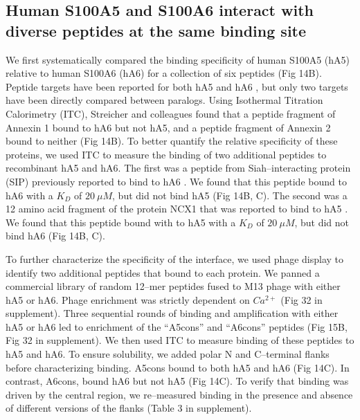 \subsection{Human S100A5 and S100A6 interact with diverse peptides at the same
binding site}

We first systematically compared the binding specificity of human
S100A5 (hA5) relative to human S100A6 (hA6) for a collection of six
peptides (Fig 14B). Peptide targets have been reported for both hA5
and hA6 \citep{lee_structure_2008,leclerc_binding_2009,slomnicki_s100a6_2009,streicher_annexin_2009,van_dieck_modulation_2009,liriano_structure_2012,cho_pentamidine_2016},
but only two targets have been directly compared between paralogs.
Using Isothermal Titration Calorimetry (ITC), Streicher and colleagues
found that a peptide fragment of Annexin 1 bound to hA6 but not hA5,
and a peptide fragment of Annexin 2 bound to neither \citep{streicher_annexin_2009}
(Fig 14B). To better quantify the relative specificity of these proteins,
we used ITC to measure the binding of two additional peptides to recombinant
hA5 and hA6. The first was a peptide from Siah--interacting protein
(SIP) previously reported to bind to hA6 \citep{lee_structure_2008}.
We found that this peptide bound to hA6 with a $K_{D}$ of $20\ \mu M$,
but did not bind hA5 (Fig 14B, C). The second was a 12 amino acid fragment
of the protein NCX1 that was reported to bind to hA5 \citep{liriano_structure_2012}.
We found that this peptide bound with to hA5 with a $K_{D}$ of $20\ \mu M$,
but did not bind hA6 (Fig 14B, C). 

To further characterize the specificity of the interface, we used
phage display to identify two additional peptides that bound to each
protein. We panned a commercial library of random 12--mer peptides
fused to M13 phage with either hA5 or hA6. Phage enrichment was strictly
dependent on $Ca^{2+}$ (Fig 32 in supplement). Three sequential rounds of binding
and amplification with either hA5 or hA6 led to enrichment of the
``A5cons'' and ``A6cons'' peptides (Fig 15B, Fig 32 in supplement). We then used
ITC to measure binding of these peptides to hA5 and hA6. To ensure
solubility, we added polar N and C--terminal flanks before characterizing
binding. A5cons bound to both hA5 and hA6 (Fig 14C). In contrast, A6cons,
bound hA6 but not hA5 (Fig 14C). To verify that binding was driven
by the central region, we re--measured binding in the presence and
absence of different versions of the flanks (Table 3 in supplement). 


